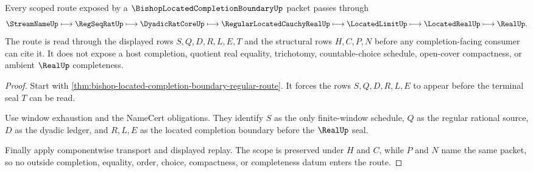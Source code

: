 \begin{theorem}
\label{thm:bishop-located-completion-boundary-scope}
Every scoped route exposed by a $\BishopLocatedCompletionBoundaryUp$ packet passes through
$$
\StreamNameUp \longmapsto \RegSeqRatUp \longmapsto \DyadicRatCoreUp \longmapsto \RegularLocatedCauchyRealUp \longmapsto \LocatedLimitUp \longmapsto \LocatedRealUp \longmapsto \RealUp .
$$
The route is read through the displayed rows $S,Q,D,R,L,E,T$ and the structural rows $H,C,P,N$ before any completion-facing consumer can cite it. It does not expose a host completion, quotient real equality, trichotomy, countable-choice schedule, open-cover compactness, or ambient $\RealUp$ completeness.
\end{theorem}
\begin{proof}
Start with \autoref{thm:bishop-located-completion-boundary-regular-route}. It forces the rows $S,Q,D,R,L,E$ to appear before the terminal seal $T$ can be read.

Use window exhaustion and the NameCert obligations. They identify $S$ as the only finite-window schedule, $Q$ as the regular rational source, $D$ as the dyadic ledger, and $R,L,E$ as the located completion boundary before the $\RealUp$ seal.

Finally apply componentwise transport and displayed replay. The scope is preserved under $H$ and $C$, while $P$ and $N$ name the same packet, so no outside completion, equality, order, choice, compactness, or completeness datum enters the route.
\end{proof}

